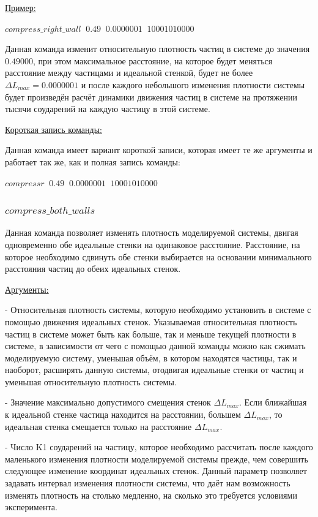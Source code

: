 \documentclass[a4paper]{article}
\begin{document}
\uline{Пример:}

$ compress\_right\_wall \;\; 0.49 \;\; 0.0000001 \;\; 1000 10 10000 $

Данная команда изменит относительную плотность частиц в системе до значения $ 0.49000 $, при этом максимальное расстояние, на которое будет меняться расстояние между частицами и идеальной стенкой, будет не более $ \Delta L_{max} = 0.0000001 $ и после каждого небольшого изменения плотности системы будет произведён расчёт динамики движения частиц в системе на протяжении тысячи соударений на каждую частицу в этой системе.

\uline{Короткая запись команды:}

Данная команда имеет вариант короткой записи, которая имеет те же аргументы и работает так же, как и полная запись команды:

$ compressr \;\; 0.49 \;\; 0.0000001 \;\; 1000 10 10000 $


\subsubsection{$ compress\_both\_walls $}
Данная команда позволяет изменять плотность моделируемой системы, двигая одновременно обе идеальные стенки на одинаковое расстояние. Расстояние, на которое необходимо сдвинуть обе стенки выбирается на основании минимального расстояния частиц до обеих идеальных стенок.

\uline{Аргументы:}

- Относительная плотность системы, которую необходимо установить в системе с помощью движения идеальных стенок. Указываемая относительная плотность частиц в системе может быть как больше, так и меньше текущей плотности в системе, в зависимости от чего с помощью данной команды можно как сжимать моделируемую систему, уменьшая объём, в котором находятся частицы, так и наоборот, расширять данную системы, отодвигая идеальные стенки от частиц и уменьшая относительную плотность системы.

- Значение максимально допустимого смещения стенок $ \Delta L_{max} $. Если ближайшая к идеальной стенке частица находится на расстоянии, большем $ \Delta L_{max} $, то идеальная стенка смещается только на расстояние $ \Delta L_{max} $.

- Число K1 соударений на частицу, которое необходимо рассчитать после каждого маленького изменения плотности моделируемой системы прежде, чем совершить следующее изменение координат идеальных стенок. Данный параметр позволяет задавать интервал изменения плотности системы, что даёт нам возможность изменять плотность на столько медленно, на сколько  это требуется условиями эксперимента.
\end{document}
